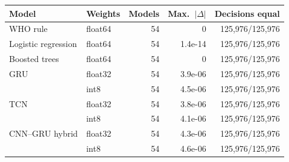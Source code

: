 \begin{tabular}{llrrr}
\toprule
Model & Weights & Models & Max.\ $|\Delta|$ & Decisions equal \\
\midrule
WHO rule & float64 & 54 & 0 & 125{,}976/125{,}976 \\
Logistic regression & float64 & 54 & 1.4e-14 & 125{,}976/125{,}976 \\
Boosted trees & float64 & 54 & 0 & 125{,}976/125{,}976 \\
GRU & float32 & 54 & 3.9e{-}06 & 125{,}976/125{,}976 \\
 & int8 & 54 & 4.5e{-}06 & 125{,}976/125{,}976 \\
TCN & float32 & 54 & 3.8e{-}06 & 125{,}976/125{,}976 \\
 & int8 & 54 & 4.1e{-}06 & 125{,}976/125{,}976 \\
CNN--GRU hybrid & float32 & 54 & 4.3e{-}06 & 125{,}976/125{,}976 \\
 & int8 & 54 & 4.6e{-}06 & 125{,}976/125{,}976 \\
\bottomrule
\end{tabular}